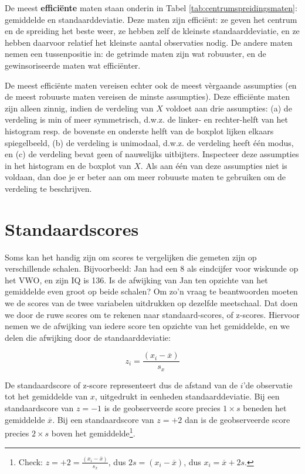 \documentclass[
]{book}
\begin{document}
De meest \textbf{efficiënte} maten staan onderin in
Tabel \ref{tab:centrumspreidingsmaten}: gemiddelde en standaarddeviatie.
Deze maten zijn efficiënt: ze geven het centrum en de spreiding het
beste weer, ze hebben zelf de kleinste standaarddeviatie, en ze hebben
daarvoor relatief het kleinste aantal observaties nodig. De andere maten
nemen een tussenpositie in: de getrimde maten zijn wat robuuster, en de
gewinsoriseerde maten wat efficiënter.

De meest efficiënte maten vereisen echter ook de meest vèrgaande
assumpties (en de meest robuuste maten vereisen de minste assumpties).
Deze efficiënte maten zijn alleen zinnig, indien de verdeling van \(X\)
voldoet aan drie assumpties: (a) de verdeling is min of meer
symmetrisch, d.w.z. de linker- en rechter-helft van het histogram resp.
de bovenste en onderste helft van de boxplot lijken elkaars
spiegelbeeld, (b) de verdeling is unimodaal, d.w.z. de verdeling heeft
één modus, en (c) de verdeling bevat geen of nauwelijks uitbijters.
Inspecteer deze assumpties in het histogram en de boxplot van \(X\). Als
aan één van deze assumpties niet is voldaan, dan doe je er beter aan om
meer robuuste maten te gebruiken om de verdeling te beschrijven.

\hypertarget{sec:standaardscores}{%
\section{Standaardscores}\label{sec:standaardscores}}

Soms kan het handig zijn om scores te vergelijken die gemeten zijn op
verschillende schalen. Bijvoorbeeld: Jan had een 8 als eindcijfer voor
wiskunde op het VWO, en zijn IQ is 136. Is de afwijking van Jan ten
opzichte van het gemiddelde even groot op beide schalen? Om zo'n vraag
te beantwoorden moeten we de scores van de twee variabelen uitdrukken op
dezelfde meetschaal. Dat doen we door de ruwe scores om te rekenen naar
standaard-scores, of z-scores. Hiervoor nemen we de afwijking van iedere
score ten opzichte van het gemiddelde, en we delen die afwijking door de
standaarddeviatie:

\begin{equation}
    z_i = \frac{(x_i-\overline{x})}{s_x}
   \label{eq:zscores}
\end{equation}

De standaardscore of z-score
representeert dus de afstand van de \(i\)'de observatie tot het gemiddelde
van \(x\), uitgedrukt in eenheden standaarddeviatie. Bij een
standaardscore van \(z=-1\) is de geobserveerde score precies \(1 \times s\)
beneden het gemiddelde \(\overline{x}\). Bij een standaardscore van \(z=+2\)
dan is de geobserveerde score precies \(2 \times s\) boven het
gemiddelde\footnote{Check: \(z = +2 = \frac{(x_i-\overline{x})}{s_x}\), dus \(2 s = (x_i-\overline{x})\), dus \(x_i = \overline{x}+2s\).}.
\end{document}
